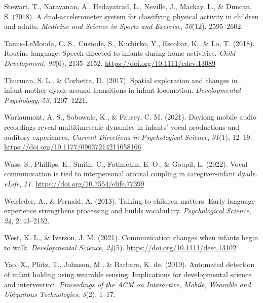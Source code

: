 \documentclass[
  man]{apa6}
\newlength{\cslhangindent}
\newlength{\cslentryspacingunit} %
\newenvironment{CSLReferences}[2] %
 {%
  \setlength{\parindent}{0pt}
  \ifodd #1
  \let\oldpar\par
  \def\par{\hangindent=\cslhangindent\oldpar}
  \fi
  \setlength{\parskip}{#2\cslentryspacingunit}
 }%
 {}
\begin{document}
\begin{CSLReferences}{1}{0}
\leavevmode{}%
Stewart, T., Narayanan, A., Hedayatrad, L., Neville, J., Mackay, L., \& Duncan, S. (2018). A dual-accelerometer system for classifying physical activity in children and adults. \emph{Medicine and Science in Sports and Exercise}, \emph{50}(12), 2595--2602.

\leavevmode{}%
Tamis-LeMonda, C. S., Custode, S., Kuchirko, Y., Escobar, K., \& Lo, T. (2018). Routine language: Speech directed to infants during home activities. \emph{Child Development}, \emph{90}(6), 2135--2152. \url{https://doi.org/10.1111/cdev.13089}

\leavevmode{}%
Thurman, S. L., \& Corbetta, D. (2017). Spatial exploration and changes in infant-mother dyads around transitions in infant locomotion. \emph{Developmental Psychology}, \emph{53}, 1207--1221.

\leavevmode{}%
Warlaumont, A. S., Sobowale, K., \& Fausey, C. M. (2021). Daylong mobile audio recordings reveal multitimescale dynamics in infants' vocal productions and auditory experiences. \emph{Current Directions in Psychological Science}, \emph{31}(1), 12--19. \url{https://doi.org/10.1177/09637214211058166}

\leavevmode{}%
Wass, S., Phillips, E., Smith, C., Fatimehin, E. O., \& Goupil, L. (2022). Vocal communication is tied to interpersonal arousal coupling in caregiver-infant dyads. \emph{{eLife}}, \emph{11}. \url{https://doi.org/10.7554/elife.77399}

\leavevmode{}%
Weisleder, A., \& Fernald, A. (2013). Talking to children matters: Early language experience strengthens processing and builds vocabulary. \emph{Psychological Science}, \emph{24}, 2143--2152.

\leavevmode{}%
West, K. L., \& Iverson, J. M. (2021). Communication changes when infants begin to walk. \emph{Developmental Science}, \emph{24}(5). \url{https://doi.org/10.1111/desc.13102}

\leavevmode{}%
Yao, X., Plötz, T., Johnson, M., \& Barbaro, K. de. (2019). Automated detection of infant holding using wearable sensing: Implications for developmental science and intervention. \emph{Proceedings of the ACM on Interactive, Mobile, Wearable and Ubiquitous Technologies}, \emph{3}(2), 1--17.

\end{CSLReferences}
\end{document}
